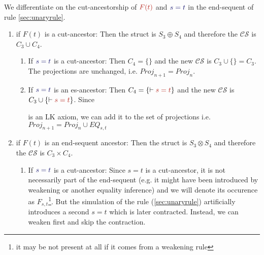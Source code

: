 \documentclass[a4paper]{article}
\newcommand{\ccs}[0]{\ensuremath{\mathcal{C}\mathcal{S}}}
\newcommand{\set}[1]{\ensuremath{\{#1\}}}
\newcommand{\red}[1]{\textcolor{BrickRed}{#1}}
\newcommand{\blue}[1]{\textcolor{MidnightBlue}{#1}}
\begin{document}
We differentiate on the cut-ancestorship of $\red{F(t)}$ and $\blue{s=t}$ in the
 end-sequent of rule \ref{sec:unaryrule}.

\begin{enumerate}
\item if $F(t)$ is a cut-ancestor:
 Then the struct is $S_3 \oplus S_4$ and therefore the \ccs{} is $C_3 \cup C_4$.
  \begin{enumerate}
  \item If $\blue{s=t}$ is a cut-ancestor:
    Then $C_4=\set{}$ and the new \ccs{} is
    $C_3 \cup \set{} = C_3 $.
    The projections are unchanged, i.e. $Proj_{n+1} = Proj_n$.

  \item If $\blue{s=t}$ is an es-ancestor:
    Then $C_4=\set{ \lkproves \red{s=t}}$ and the new \ccs{} is
    $C_3 \cup \set{\lkproves \red{s=t}}$.
    Since
    \begin{prooftree}
    \end{prooftree}

    is an LK axiom, we can add it to the set
    of projections i.e. $Proj_{n+1} = Proj_n \cup EQ_{s,t}$
  \end{enumerate}

\item if $F(t)$ is an end-sequent ancestor:
  Then the struct is $S_3 \otimes S_4$ and therefore the \ccs{} is
  $C_3 \times C_4$.
  \begin{enumerate}
  \item If $\blue{s=t}$ is a cut-ancestor:
    \label{opt1}
    Since $s=t$ is a cut-ancestor, it is not necessarily part of the end-sequent
    (e.g. it might have been introduced by weakening or another equality
    inference) and we will denote its occurence as $F_{s,t}$\footnote{it may be
      not present at all if it comes from a weakening rule}. But the simulation
    of the rule (\ref{sec:unaryrule}) artificially introduces a second $s=t$
    which is later contracted. Instead, we can weaken first and skip the
    contraction.\\


\end{enumerate}
\end{enumerate}
\end{document}
